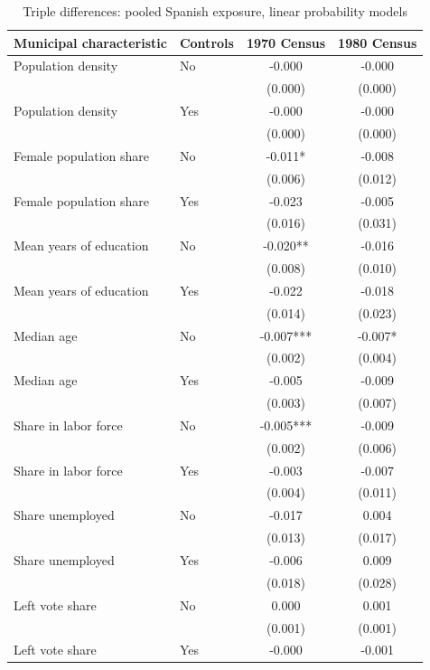 \begin{table}[!htbp]
\normalsize
\renewcommand{\arraystretch}{1.25}
\setlength{\tabcolsep}{6pt}
\centering
\caption{Triple differences: pooled Spanish exposure, linear probability models}
\label{tab:triple_pooled_share_lpm_stata}
\setlength{\tabcolsep}{4pt}
\captionsetup{justification=centering}
\begin{tabular}{llcc}
\hline
Municipal characteristic & Controls & 1970 Census & 1980 Census \\
\hline
Population density & No & -0.000 & -0.000 \\
 & & (0.000) & (0.000) \\
Population density & Yes & -0.000 & -0.000 \\
 & & (0.000) & (0.000) \\
\addlinespace
Female population share & No & -0.011* & -0.008 \\
 & & (0.006) & (0.012) \\
Female population share & Yes & -0.023 & -0.005 \\
 & & (0.016) & (0.031) \\
\addlinespace
Mean years of education & No & -0.020** & -0.016 \\
 & & (0.008) & (0.010) \\
Mean years of education & Yes & -0.022 & -0.018 \\
 & & (0.014) & (0.023) \\
\addlinespace
Median age & No & -0.007*** & -0.007* \\
 & & (0.002) & (0.004) \\
Median age & Yes & -0.005 & -0.009 \\
 & & (0.003) & (0.007) \\
\addlinespace
Share in labor force & No & -0.005*** & -0.009 \\
 & & (0.002) & (0.006) \\
Share in labor force & Yes & -0.003 & -0.007 \\
 & & (0.004) & (0.011) \\
\addlinespace
Share unemployed & No & -0.017 & 0.004 \\
 & & (0.013) & (0.017) \\
Share unemployed & Yes & -0.006 & 0.009 \\
 & & (0.018) & (0.028) \\
\addlinespace
Left vote share & No & 0.000 & 0.001 \\
 & & (0.001) & (0.001) \\
Left vote share & Yes & -0.000 & -0.001 \\

\end{tabular}
\end{table}
